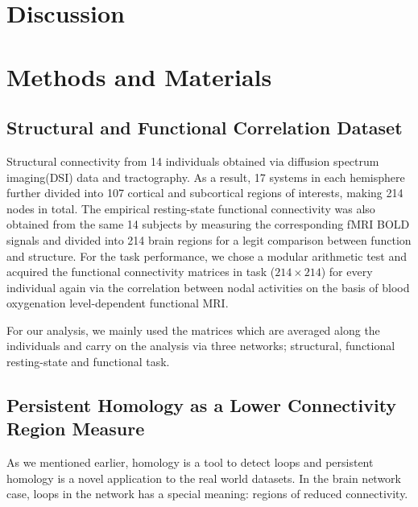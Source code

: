 \documentclass[9pt,twocolumn,twoside,lineno]{pnas-new}
\begin{document}
\section*{Discussion}

\section*{Methods and Materials}

\subsection{Structural and Functional Correlation Dataset} Structural connectivity from 14 individuals obtained via diffusion spectrum imaging(DSI) data and tractography. As a result, 17 systems in each hemisphere further divided into 107 cortical and subcortical regions of interests, making 214 nodes in total.
The empirical resting-state functional connectivity was also obtained from the same 14 subjects by measuring the corresponding fMRI BOLD signals and divided into 214 brain regions for a legit comparison between function and structure. For the task performance, we chose a modular arithmetic test and acquired the functional connectivity matrices in task ($214\times 214$) for every individual again via the correlation between nodal activities on the basis of blood oxygenation level-dependent functional MRI. 

For our analysis, we mainly used the matrices which are averaged along the individuals and carry on the analysis via three networks; structural, functional resting-state and functional task.

\subsection{Persistent Homology as a Lower Connectivity Region Measure}
As we mentioned earlier, homology is a tool to detect loops and persistent homology is a novel application to the real world datasets. In the brain network case, loops in the network has a special meaning: regions of reduced connectivity.
\end{document}
